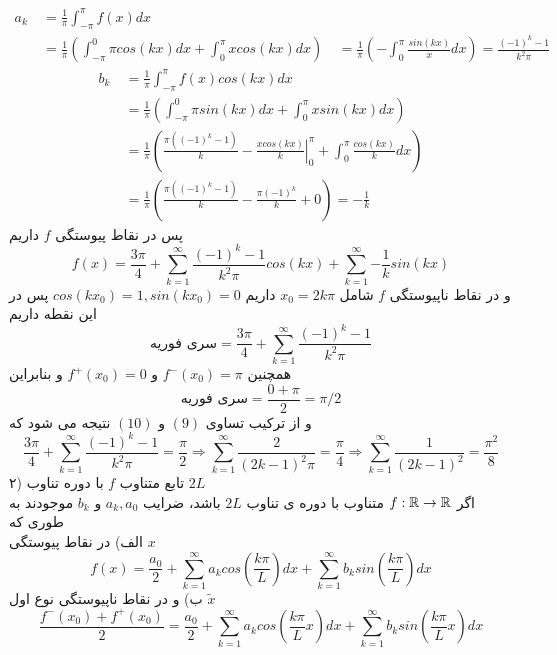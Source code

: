 \begin{equation*}
	\begin{aligned}
		a_k {} &\
		=\frac{1}{\pi}\int_{-\pi}^{\pi}{f(x)dx} \\
		&\
		=\frac{1}{\pi}\left(\int_{-\pi}^{0}{\pi cos(kx)dx}+\int_{0}^{\pi}{x cos(kx)dx}\right)
		&\
		=\frac{1}{\pi}\left(-\int_0^\pi{\frac{sin(kx)}{x}dx}\right)=\frac{(-1)^k-1}{k^2\pi}
	\end{aligned}
\end{equation*}
\begin{equation*}
	\begin{aligned}
		b_k {} &\
		=\frac{1}{\pi}\int_{-\pi}^{\pi}{f(x)cos(kx)dx}\\
		&\
		=\frac{1}{\pi}\left(\int_{-\pi}^{0}{\pi sin(kx)dx}+\int_{0}^\pi{xsin(kx)dx}\right)\\
		&\
		=\frac{1}{\pi}\left(\frac{\pi\left((-1)^k-1\right)}{k}-\left.{\frac{xcos(kx)}{k}}\right |_0^\pi+\int_0^\pi{\frac{cos(kx)}{k}dx}\right)\\
		&\
		=\frac{1}{\pi}\left(\frac{\pi\left((-1)^k-1\right)}{k}-\frac{\pi(-1)^k}{k}+0\right)=-\frac{1}{k}
	\end{aligned}
\end{equation*}
پس در نقاط پیوستگی 
$f$
داریم
\[
f(x)=\frac{3\pi}{4}+\sum_{k=1}^\infty{\frac{(-1)^k-1}{k^2\pi}cos(kx)}+\sum_{k=1}^\infty{-\frac{1}{k}sin(kx)}
\]
و در نقاط ناپیوستگی 
$f$
شامل
$x_0=2k\pi$
داریم 
$cos(kx_0)=1,sin(kx_0)=0$
پس در این نقطه داریم
\begin{equation}
	\text{سری فوریه}=
	\frac{3\pi}{4}+\sum_{k=1}^\infty{\frac{(-1)^k-1}{k^2\pi}}
\end{equation}
همچنین 
$f^-(x_0)=\pi$
و
$f^+(x_0)=0$
و بنابراین 
\begin{equation}
	\text{سری فوریه}=
	\frac{0+\pi}{2}=\pi/2
\end{equation}
و از ترکیب تساوی
$(9)$
و
$(10)$
نتیجه می شود که
\[
\frac{3\pi}{4}+\sum_{k=1}^\infty{\frac{(-1)^k-1}{k^2\pi}}=\frac{\pi}{2}\Rightarrow
\sum_{k=1}^\infty{\frac{2}{(2k-1)^2\pi}}=\frac{\pi}{4}\Rightarrow
\sum_{k=1}^\infty{\frac{1}{(2k-1)^2}}=\frac{\pi^2}{8}
\]
۲) تابع متناوب
$f$
با دوره تناوب
$2L$\\
اگر
$f:\mathbb{R}\to\mathbb{R}$
متناوب با دوره ی تناوب 
$2L$
باشد، ضرایب 
$a_k,a_0$
و
$b_k$
موجودند به طوری که\\
الف) در نقاط پیوستگی 
$x$
\[
f(x)=\frac{a_0}{2}+\sum_{k=1}^\infty{a_kcos\left(\frac{k\pi}{L}\right)dx}+\sum_{k=1}^\infty{b_ksin\left(\frac{k\pi}{L}\right)dx}
\]
ب) و در نقاط ناپیوستگی نوع اول
$\tilde{x}$
\[
\frac{f^-(x_0)+f^+(x_0)}{2}=\frac{a_0}{2}+\sum_{k=1}^\infty{a_kcos\left(\frac{k\pi}{L}x\right)dx}+\sum_{k=1}^\infty{b_ksin\left(\frac{k\pi}{L}x\right)dx}
\]
